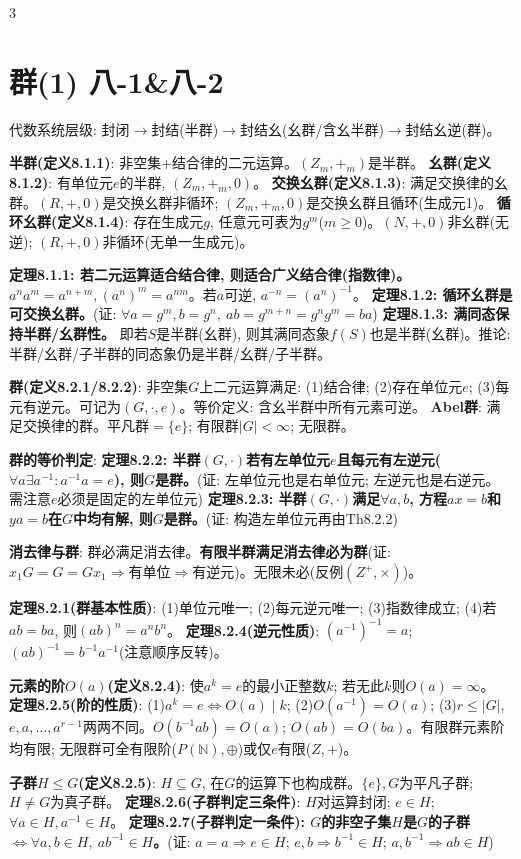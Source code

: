 \documentclass[4.5pt,landscape]{extarticle}
\newcommand{\rd}[1]{\textcolor{rd}{\textbf{#1}}}
\newcommand{\bu}[1]{\textcolor{bu}{\textbf{#1}}}
\newcommand{\xt}[1]{\textbf{#1}}
\begin{document}
\begin{multicols*}{3}
\section{群(1) 八-1\&八-2}
代数系统层级: 封闭$\to$封结(半群)$\to$封结幺(幺群/含幺半群)$\to$封结幺逆(群)。

\xt{半群(定义8.1.1)}: 非空集+结合律的二元运算。$(Z_m,+_m)$是半群。
\xt{幺群(定义8.1.2)}: 有单位元$e$的半群, $(Z_m,+_m,0)$。
\xt{交换幺群(定义8.1.3)}: 满足交换律的幺群。$(R,+,0)$是交换幺群非循环; $(Z_m,+_m,0)$是交换幺群且循环(生成元1)。
\xt{循环幺群(定义8.1.4)}: 存在生成元$g$, 任意元可表为$g^m$($m\geq0$)。$(N,+,0)$非幺群(无逆); $(R,+,0)$非循环(无单一生成元)。

\bu{定理8.1.1: 若二元运算适合结合律, 则适合广义结合律(指数律)。}$a^na^m=a^{n+m}, (a^n)^m=a^{nm}$。若$a$可逆, $a^{-n}=(a^n)^{-1}$。
\bu{定理8.1.2: 循环幺群是可交换幺群。}(证: $\forall a=g^m,b=g^n,\ ab=g^{m+n}=g^ng^m=ba$)
\bu{定理8.1.3: 满同态保持半群/幺群性。} 即若$S$是半群(幺群), 则其满同态象$f(S)$也是半群(幺群)。推论: 半群/幺群/子半群的同态象仍是半群/幺群/子半群。

\xt{群(定义8.2.1/8.2.2)}: 非空集$G$上二元运算满足: (1)结合律; (2)存在单位元$e$; (3)每元有逆元。可记为$(G,\cdot,e)$。等价定义: 含幺半群中所有元素可逆。
\xt{Abel群}: 满足交换律的群。平凡群$=\{e\}$; 有限群$|G|<\infty$; 无限群。

\xt{群的等价判定}:
\bu{定理8.2.2: 半群$(G,\cdot)$若有左单位元$e$且每元有左逆元($\forall a\exists a^{-1}:a^{-1}a=e$), 则$G$是群。}(证: 左单位元也是右单位元; 左逆元也是右逆元。需注意$e$必须是固定的左单位元)
\bu{定理8.2.3: 半群$(G,\cdot)$满足$\forall a,b$, 方程$ax=b$和$ya=b$在$G$中均有解, 则$G$是群。}(证: 构造左单位元再由Th8.2.2)

\rd{消去律与群}: 群必满足消去律。\rd{有限半群满足消去律必为群}(证: $x_1G=G=Gx_1\Rightarrow$有单位$\Rightarrow$有逆元)。无限未必(反例$(Z^+,\times)$)。

\bu{定理8.2.1(群基本性质)}: (1)单位元唯一; (2)每元逆元唯一; (3)指数律成立; (4)若$ab=ba$, 则$(ab)^n=a^nb^n$。
\bu{定理8.2.4(逆元性质)}: $(a^{-1})^{-1}=a$; \rd{$(ab)^{-1}=b^{-1}a^{-1}$}(注意顺序反转)。

\xt{元素的阶$O(a)$(定义8.2.4)}: 使$a^k=e$的最小正整数$k$; 若无此$k$则$O(a)=\infty$。
\bu{定理8.2.5(阶的性质)}: (1)$a^k=e\Leftrightarrow O(a)\mid k$; (2)$O(a^{-1})=O(a)$; (3)$r\leq|G|$, $e,a,\dots,a^{r-1}$两两不同。$O(b^{-1}ab)=O(a)$; $O(ab)=O(ba)$。有限群元素阶均有限; 无限群可全有限阶($P(\mathbb N),\oplus$)或仅$e$有限($Z,+$)。

\xt{子群$H\leq G$(定义8.2.5)}: $H\subseteq G$, 在$G$的运算下也构成群。$\{e\},G$为平凡子群; $H\neq G$为真子群。
\bu{定理8.2.6(子群判定三条件)}: $H$对运算封闭; $e\in H$; $\forall a\in H, a^{-1}\in H$。
\rd{定理8.2.7(子群判定一条件): $G$的非空子集$H$是$G$的子群$\Leftrightarrow\forall a,b\in H,\ ab^{-1}\in H$。}(证: $a=a\Rightarrow e\in H$; $e,b\Rightarrow b^{-1}\in H$; $a,b^{-1}\Rightarrow ab\in H$)


\end{multicols*}
\end{document}
